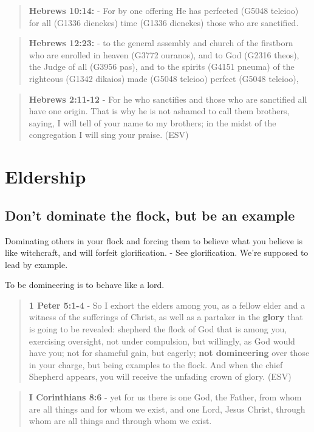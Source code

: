 \documentclass[11pt]{article}
\begin{document}
\begin{quote}
\textbf{Hebrews 10:14:} - For by one offering He has perfected (G5048 teleioo) for all (G1336 dienekes) time (G1336 dienekes) those who are sanctified.
\end{quote}

\begin{quote}
\textbf{Hebrews 12:23:} - to the general assembly and church of the firstborn who are enrolled in heaven (G3772 ouranos), and to God (G2316 theos), the Judge of all (G3956 pas), and to the spirits (G4151 pneuma) of the righteous (G1342 dikaios) made (G5048 teleioo) perfect (G5048 teleioo),
\end{quote}

\begin{quote}
\textbf{Hebrews 2:11-12} -  For he who sanctifies and those who are sanctified all have one origin.  That is why he is not ashamed to call them brothers, saying, I will tell of your name to my brothers; in the midst of the congregation I will sing your praise.  (ESV)
\end{quote}

\section{Eldership}
\label{sec:org9070186}
\subsection{Don't dominate the flock, but be an example}
\label{sec:org5d61347}
Dominating others in your flock and forcing them to believe what you believe is like witchcraft, and will forfeit glorification. - See glorification.
We're supposed to lead by example.

To be domineering is to behave like a lord.

\begin{quote}
\textbf{1 Peter 5:1-4} - So I exhort the elders among you, as a fellow elder and a witness of the sufferings of Christ, as well as a partaker in the \textbf{glory} that is going to be revealed: shepherd the flock of God that is among you, exercising oversight, not under compulsion, but willingly, as God would have you; not for shameful gain, but eagerly; \textbf{not domineering} over those in your charge, but being examples to the flock. And when the chief Shepherd appears, you will receive the unfading crown of glory. (ESV)
\end{quote}

\begin{quote}
\textbf{I Corinthians 8:6} - yet for us there is one God, the Father, from whom are all things and for whom we exist, and one Lord, Jesus Christ, through whom are all things and through whom we exist.
\end{quote}
\end{document}
